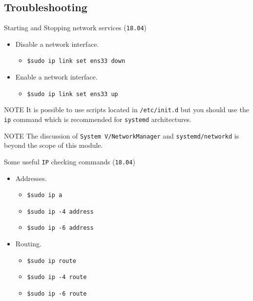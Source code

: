 \documentclass{beamer}
\begin{document}
\subsection{Troubleshooting}
\begin{frame}{Starting and Stopping network services (\texttt{18.04})}
  \begin{itemize}
    \item Disable a network interface.
    \begin{itemize}
      \item \texttt{\$sudo ip link set ens33 down}
    \end{itemize}
  \end{itemize}
  \begin{itemize}
    \item Enable a network interface.
    \begin{itemize}
      \item \texttt{\$sudo ip link set ens33 up}
    \end{itemize}
  \end{itemize}
  \begin{block}{NOTE}
    It is possible to use scripts located in \texttt{/etc/init.d} but you should use the \texttt{ip} command which is recommended for \texttt{systemd} architectures.  
  \end{block}
  \begin{block}{NOTE}
    The discussion of \texttt{System V/NetworkManager} and \texttt{systemd/networkd} is beyond the scope of this module.  
  \end{block}
\end{frame}

\begin{frame}{Some useful \texttt{IP} checking commands (\texttt{18.04})}
  \begin{itemize}
    \item Addresses.
    \begin{itemize}
      \item \texttt{\$sudo ip a}
      \item \texttt{\$sudo ip -4 address}
      \item \texttt{\$sudo ip -6 address}
    \end{itemize}
    \item Routing.
    \begin{itemize}
      \item \texttt{\$sudo ip route}
      \item \texttt{\$sudo ip -4 route}
      \item \texttt{\$sudo ip -6 route}
    \end{itemize}
  \end{itemize}
\end{frame}
\end{document}
